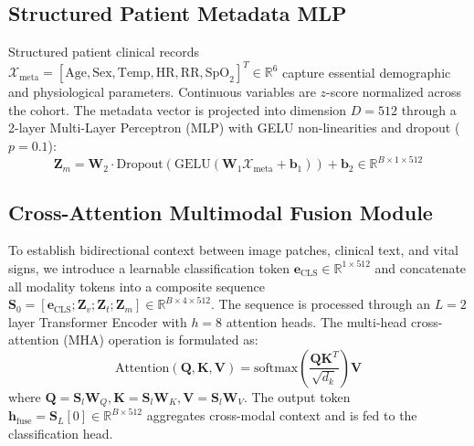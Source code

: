 \documentclass[conference]{IEEEtran}
\begin{document}
\subsection{Structured Patient Metadata MLP}
Structured patient clinical records $\mathcal{X}_{\text{meta}} = [\text{Age}, \text{Sex}, \text{Temp}, \text{HR}, \text{RR}, \text{SpO}_2]^T \in \mathbb{R}^6$ capture essential demographic and physiological parameters. Continuous variables are $z$-score normalized across the cohort. The metadata vector is projected into dimension $D=512$ through a 2-layer Multi-Layer Perceptron (MLP) with GELU non-linearities and dropout ($p=0.1$):
\begin{equation}
\mathbf{Z}_m = \mathbf{W}_2 \cdot \text{Dropout}(\text{GELU}(\mathbf{W}_1 \mathcal{X}_{\text{meta}} + \mathbf{b}_1)) + \mathbf{b}_2 \in \mathbb{R}^{B \times 1 \times 512}
\label{eq:metadata}
\end{equation}

\subsection{Cross-Attention Multimodal Fusion Module}
To establish bidirectional context between image patches, clinical text, and vital signs, we introduce a learnable classification token $\mathbf{e}_{\text{CLS}} \in \mathbb{R}^{1 \times 512}$ and concatenate all modality tokens into a composite sequence $\mathbf{S}_0 = [\mathbf{e}_{\text{CLS}}; \mathbf{Z}_v; \mathbf{Z}_t; \mathbf{Z}_m] \in \mathbb{R}^{B \times 4 \times 512}$. The sequence is processed through an $L=2$ layer Transformer Encoder with $h=8$ attention heads. The multi-head cross-attention (MHA) operation is formulated as:
\begin{equation}
\text{Attention}(\mathbf{Q}, \mathbf{K}, \mathbf{V}) = \text{softmax}\left(\frac{\mathbf{Q}\mathbf{K}^T}{\sqrt{d_k}}\right) \mathbf{V}
\label{eq:mha}
\end{equation}
where $\mathbf{Q} = \mathbf{S}_l \mathbf{W}_Q, \mathbf{K} = \mathbf{S}_l \mathbf{W}_K, \mathbf{V} = \mathbf{S}_l \mathbf{W}_V$. The output token $\mathbf{h}_{\text{fuse}} = \mathbf{S}_L[0] \in \mathbb{R}^{B \times 512}$ aggregates cross-modal context and is fed to the classification head.
\end{document}
